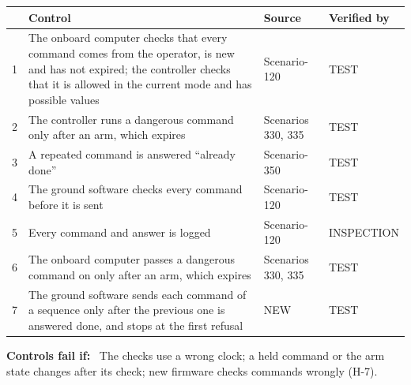 \documentclass[11pt,a4paper]{article}
\newcommand{\field}[1]{\par\noindent\textbf{#1:}~}
\begin{document}
{\small\noindent\begin{tabularx}{\textwidth}{@{}l>{\raggedright\arraybackslash}X>{\raggedright\arraybackslash}p{3.0cm}>{\raggedright\arraybackslash}p{3.35cm}@{}}
\toprule
 & Control & Source & Verified by \\
\midrule
1 & The onboard computer checks that every command comes from the operator, is new and has not expired; the controller checks that it is allowed in the current mode and has possible values & Scenario-120 & TEST \\
2 & The controller runs a dangerous command only after an arm, which expires & Scenarios 330, 335 & TEST \\
3 & A repeated command is answered ``already done'' & Scenario-350 & TEST \\
4 & The ground software checks every command before it is sent & Scenario-120 & TEST \\
5 & Every command and answer is logged & Scenario-120 & INSPECTION \\
6 & The onboard computer passes a dangerous command on only after an arm, which expires & Scenarios 330, 335 & TEST \\
7 & The ground software sends each command of a sequence only after the previous one is answered done, and stops at the first refusal & NEW & TEST \\
\bottomrule
\end{tabularx}}
\par\smallskip
\field{Controls fail if} The checks use a wrong clock; a held command or the arm state changes after its check; new firmware checks commands wrongly (H-7).
\end{document}
